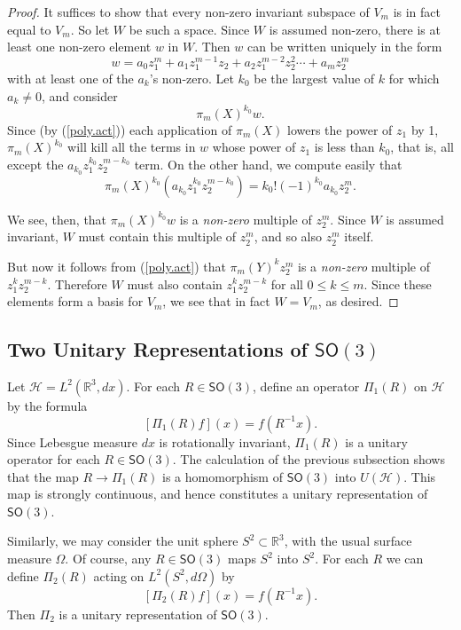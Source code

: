 \documentclass{amsbook}
\theoremstyle{plain}
\numberwithin{equation}{chapter}
\numberwithin{theorem}{chapter}
\begin{document}
\begin{proof}
It suffices to show that every non-zero invariant subspace of $V_{m}$ is in
fact equal to $V_{m}$. So let $W$ be such a space. Since $W$ is assumed
non-zero, there is at least one non-zero element $w$ in $W$. Then $w$ can be
written uniquely in the form
\[
w=a_{0}z_{1}^{m}+a_{1}z_{1}^{m-1}z_{2}+a_{2}z_{1}^{m-2}z_{2}^{2}\cdots
+a_{m}z_{2}^{m}%
\]
with at least one of the $a_{k}$'s non-zero. Let $k_{0}$ be the largest value
of $k$ for which $a_{k}\neq0$, and consider
\[
\pi_{m}(X)^{k_{0}}w\text{.}%
\]
Since (by (\ref{poly.act})) each application of $\pi_{m}(X)$ lowers the power
of $z_{1}$ by 1, $\pi_{m}(X)^{k_{0}}$ will kill all the terms in $w$ whose
power of $z_{1}$ is less than $k_{0}$, that is, all except the $a_{k_{0}}%
z_{1}^{k_{0}}z_{2}^{m-k_{0}}$ term. On the other hand, we compute easily that
\[
\pi_{m}(X)^{k_{0}}\left(  a_{k_{0}}z_{1}^{k_{0}}z_{2}^{m-k_{0}}\right)
=k_{0}!(-1)^{k_{0}}a_{k_{0}}z_{2}^{m}\text{.}%
\]

We see, then, that $\pi_{m}(X)^{k_{0}}w$ is a \textit{non-zero} multiple of
$z_{2}^{m}$. Since $W$ is assumed invariant, $W$ must contain this multiple of
$z_{2}^{m}$, and so also $z_{2}^{m}$ itself.

But now it follows from (\ref{poly.act}) that $\pi_{m}(Y)^{k}z_{2}^{m}$ is a
\textit{non-zero} multiple of $z_{1}^{k}z_{2}^{m-k}$. Therefore $W$ must also
contain $z_{1}^{k}z_{2}^{m-k}$ for all $0\leq k\leq m$. Since these elements
form a basis for $V_{m}$, we see that in fact $W=V_{m}$, as desired.
\end{proof}

\subsection{Two Unitary Representations of $\mathsf{SO}(3)$}

Let $\mathcal{H}=L^{2}(\mathbb{R}^{3},dx)$. For each $R\in\mathsf{SO}(3)$,
define an operator $\Pi_{1}(R)$ on $\mathcal{H}$ by the formula
\[
\left[  \Pi_{1}(R)f\right]  (x)=f\left(  R^{-1}x\right)  \text{.}%
\]
Since Lebesgue measure $dx$ is rotationally invariant, $\Pi_{1}(R)$ is a
unitary operator for each $R\in\mathsf{SO}(3)$. The calculation of the
previous subsection shows that the map $R\rightarrow\Pi_{1}(R)$ is a
homomorphism of $\mathsf{SO}(3)$ into $U(\mathcal{H})$. This map is strongly
continuous, and hence constitutes a unitary representation of $\mathsf{SO}(3)
$.

Similarly, we may consider the unit sphere $S^{2}\subset\mathbb{R}^{3}$, with
the usual surface measure $\Omega$. Of course, any $R\in\mathsf{SO}(3)$ maps
$S^{2}$ into $S^{2}$. For each $R$ we can define $\Pi_{2}(R)$ acting on
$L^{2}(S^{2},d\Omega)$ by
\[
\left[  \Pi_{2}(R)f\right]  (x)=f\left(  R^{-1}x\right)  \text{.}%
\]
Then $\Pi_{2}$ is a unitary representation of $\mathsf{SO}(3)$.
\end{document}
